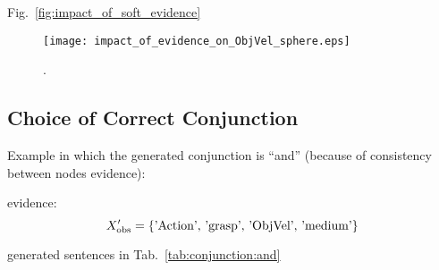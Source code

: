 Fig.~\ref{fig:impact_of_soft_evidence}


\begin{figure}
\centering
\texttt{[image: impact\_of\_evidence\_on\_ObjVel\_sphere.eps]}
\caption{.}
\label{fig:impact_of_evidence_on_ObjVel_sphere}
\end{figure}

\subsection{Choice of Correct Conjunction}

\newcommand{\evidenceProducingAnd}{'Action', 'grasp', 'ObjVel', 'medium'}

Example in which the generated conjunction is ``and'' (because of consistency between nodes evidence):

evidence:
\begin{equation} \label{eq:evidence_producing_and}
    \xobs^\prime = \{ \text{\evidenceProducingAnd} \}
\end{equation}



generated sentences in Tab.~\ref{tab:conjunction:and}

